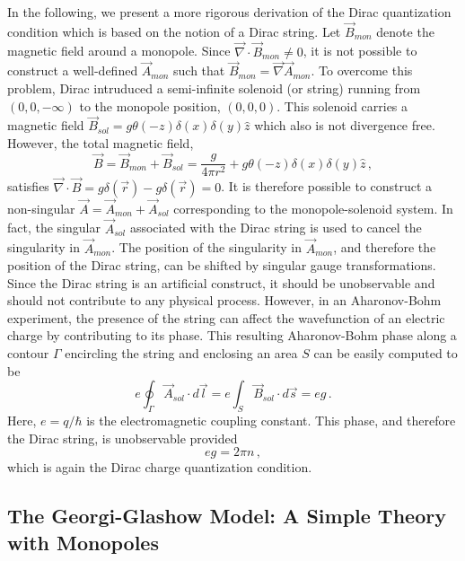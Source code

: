 In the following, we present a more rigorous derivation of the Dirac
quantization condition which is based on the notion of a Dirac
string. Let $\vec{B}_{mon}$ denote the magnetic field around a
monopole. Since $\vec{\nabla}\cdot\vec{B}_{mon}\ne 0$, it is not
possible to construct a well-defined $\vec{A}_{mon}$ such that
$\vec{B}_{mon}=\vec{\nabla} \vec{A}_{mon}$. To overcome this problem,
Dirac intruduced a  semi-infinite solenoid (or string) running from
$(0,0,-\infty)$ to the monopole position, $(0,0,0)$. This solenoid
carries a magnetic field $\vec{B}_{sol}=g\theta (-z)\delta(x)
\delta(y)\hat{z}$ which also is not divergence free. However, the
total magnetic field,   
\begin{equation}
\vec{B}=\vec{B}_{mon}+\vec{B}_{sol}=\frac{g}{4\pi r^{2}}+g\theta(-z)
\delta(x)\delta(y)\hat{z}\,,
\end{equation}
satisfies $\vec{\nabla}\cdot\vec{B}=g\delta(\vec{r})-g\delta(\vec{r}) 
=0$. It is therefore possible to construct a non-singular $\vec{A}=
\vec{A}_{mon}+\vec{A}_{sol}$ corresponding to the monopole-solenoid
system. In fact, the singular $\vec{A}_{sol}$ associated with the
Dirac string is used to cancel the singularity in $\vec{A}_{mon}$. The
position of the singularity in $\vec{A}_{mon}$, and therefore the
position of the Dirac string, can be shifted by singular gauge
transformations. Since the Dirac string is an artificial construct, it
should be unobservable and should not contribute to any physical
process. However, in an Aharonov-Bohm experiment, the presence of the
string can affect the wavefunction of an electric charge by
contributing to its phase. This resulting Aharonov-Bohm phase along a
contour $\Gamma$ encircling the string and enclosing an area $S$ can
be easily computed to be
$$
e \oint_{\Gamma} \vec{A}_{sol} \cdot d \vec{l} = e \int_S
\vec{B}_{sol} \cdot d\vec{s} = e g\,.
$$
Here, $e=q/\hbar$ is the electromagnetic coupling constant. This
phase, and therefore the Dirac string, is unobservable provided 
$$
e g = 2\pi n\,,
$$
which is again the Dirac charge quantization condition.

\subsection{The Georgi-Glashow Model: A Simple Theory with Monopoles}

